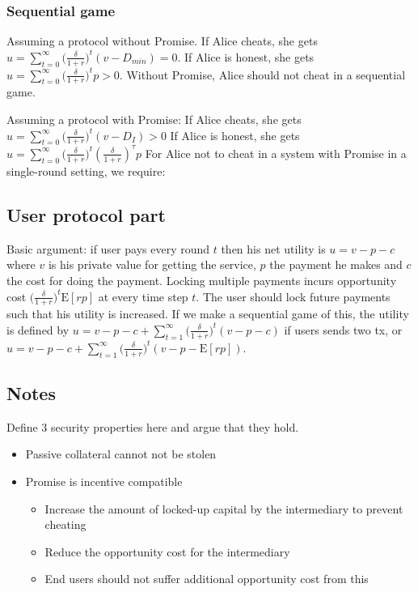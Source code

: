 \documentclass[runningheads]{llncs}
\newcommand{\sys}{Promise\xspace}
\begin{document}
\subsubsection{Sequential game}
Assuming a protocol without \sys.
If Alice cheats, she gets $u = \sum_{t=0}^{\infty} \big( \frac{\delta}{1+r} \big)^{t} (v - D_{min}) = 0$.
If Alice is honest, she gets $u = \sum_{t=0}^{\infty} \big( \frac{\delta}{1+r} \big)^{t} p > 0$.
Without \sys, Alice should not cheat in a sequential game.

Assuming a protocol with \sys:
If Alice cheats, she gets $u = \sum_{t=0}^{\infty} \big( \frac{\delta}{1+r} \big)^{t} (v - D_{I}) > 0$
If Alice is honest, she gets $u = \sum_{t=0}^{\infty} \big( \frac{\delta}{1+r} \big)^{t} (\frac{\delta}{1+r})^{\tau} p$
For Alice not to cheat in a system with \sys in a single-round setting, we require:



\subsection{User protocol part}
Basic argument:
if user pays every round $t$ then his net utility is $u = v - p - c$ where $v$ is his private value for getting the service, $p$ the payment he makes and $c$ the cost for doing the payment.
Locking multiple payments incurs opportunity cost $\big( \frac{\delta}{1+r} \big)^t \mathrm{E}[rp]$ at every time step $t$.
The user should lock future payments such that his utility is increased.
If we make a sequential game of this, the utility is defined by $u = v - p - c + \sum_{t=1}^{\infty} \big( \frac{\delta}{1+r} \big)^t (v - p - c)$ if users sends two tx, or $u = v - p - c + \sum_{t=1}^{\infty} \big( \frac{\delta}{1+r} \big)^t (v - p - \mathrm{E}[rp])$.



\subsection{Notes}
Define 3 security properties here and argue that they hold. 


\begin{itemize}
    \item Passive collateral cannot not be stolen
    \item Promise is incentive compatible
    \begin{itemize}
        \item Increase the amount of locked-up capital by the intermediary to prevent cheating
        \item Reduce the opportunity cost for the intermediary
        \item End users should not suffer additional opportunity cost from this
    \end{itemize}
\end{itemize}
\end{document}
